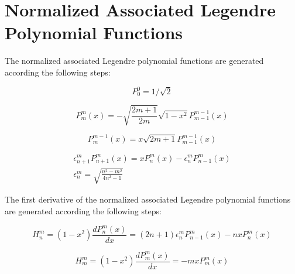 \documentclass[12pt,a4paper]{book}
\begin{document}
\chapter{Normalized Associated Legendre Polynomial Functions} \label{appendixC.legendre}

The normalized associated Legendre polynomial functions are generated according the following steps:

	\begin{equation}  \label{eq:c1}
	\displaystyle P_0^0 = 1/\sqrt{2}
	\end{equation}	

	\begin{equation}  \label{eq:c2}
	\displaystyle P_m^m(x) = -\sqrt{\frac{2m+1}{2m}} \sqrt{1-x^2} P_{m-1}^{m-1}(x)
	\end{equation}	

	\begin{equation}  \label{eq:c3}
	\displaystyle P_m^{m-1}(x) = x \sqrt{2m+1}  P_{m-1}^{m-1}(x)
	\end{equation}	

	\begin{equation}  \label{eq:c4}
	\begin{array}{l}
	\displaystyle \epsilon_{n+1}^m P_{n+1}^{m}(x) = x P_n^m(x) - \epsilon_n^m P_{n-1}^m(x) \\
	\displaystyle \epsilon_n^m = \sqrt{\frac{n^2-m^2}{4n^2-1}} 
	\end{array}
	\end{equation}	

The first derivative of the normalized associated Legendre polynomial functions are generated according the following steps:

	\begin{equation}  \label{eq:c5}
	\displaystyle H_n^m = (1-x^2)\frac{dP_n^m(x)}{dx} = (2n+1)\epsilon_n^m P_{n-1}^m(x) - nxP_n^m(x)
	\end{equation}	

	\begin{equation}  \label{eq:c6}
	\displaystyle H_m^m = (1-x^2)\frac{dP_m^m(x)}{dx} = -mxP_m^m(x)
	\end{equation}	
	
	
\end{document}
